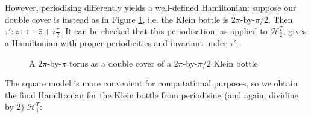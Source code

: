 \documentclass[11pt,twoside]{article}
\theoremstyle{definition}
\numberwithin{equation}{section}
\begin{document}
However, periodising differently yields a well-defined Hamiltonian: suppose our double cover is instead  as in Figure \ref{fig:model of the Klein bottle alt}, i.e. the Klein bottle is $2\pi$-by-$\pi/2$. Then $\tau':z\mapsto -\bar{z} + i\frac{\pi}{2}$. It can be checked that this periodisation, as applied to $\mathcal{H}^T_2$, gives a Hamiltonian with proper periodicities and invariant under $\tau'$. 
\begin{figure}
    \centering
    \caption{A $2\pi$-by-$\pi$ torus as a double  cover of a $2\pi$-by-$\pi/2$ Klein bottle}
     \label{fig:model of the Klein bottle alt}
\end{figure}


The square model is more convenient for  computational purposes, so we  obtain the final Hamiltonian  for the Klein bottle from periodising (and again, dividing by 2) $\mathcal{H}^T_1$: 
\end{document}
